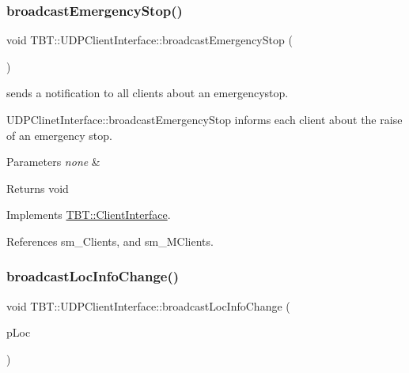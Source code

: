 \subsubsection{\texorpdfstring{broadcast\+Emergency\+Stop()}{broadcastEmergencyStop()}}
{\footnotesize\ttfamily void T\+B\+T\+::\+U\+D\+P\+Client\+Interface\+::broadcast\+Emergency\+Stop (\begin{DoxyParamCaption}\item[{void}]{ }\end{DoxyParamCaption})\hspace{0.3cm}{\ttfamily [virtual]}}



sends a notification to all clients about an emergencystop. 

U\+D\+P\+Clinet\+Interface\+::broadcast\+Emergency\+Stop informs each client about the raise of an emergency stop.


\begin{DoxyParams}{Parameters}
{\em none} & \\
\hline
\end{DoxyParams}
\begin{DoxyReturn}{Returns}
void 
\end{DoxyReturn}


Implements \hyperlink{classTBT_1_1ClientInterface_a8d19220baccb47a7c9f45d0288bebcb8_a8d19220baccb47a7c9f45d0288bebcb8}{T\+B\+T\+::\+Client\+Interface}.



References sm\+\_\+\+Clients, and sm\+\_\+\+M\+Clients.

\mbox{\label{classTBT_1_1UDPClientInterface_af4e63115b3156b151d4dfd50342b36e7_af4e63115b3156b151d4dfd50342b36e7}} 
\subsubsection{\texorpdfstring{broadcast\+Loc\+Info\+Change()}{broadcastLocInfoChange()}}
{\footnotesize\ttfamily void T\+B\+T\+::\+U\+D\+P\+Client\+Interface\+::broadcast\+Loc\+Info\+Change (\begin{DoxyParamCaption}\item[{\hyperlink{classTBT_1_1LocDecoder}{Loc\+Decoder} $\ast$}]{p\+Loc }\end{DoxyParamCaption})\hspace{0.3cm}{\ttfamily [virtual]}}



